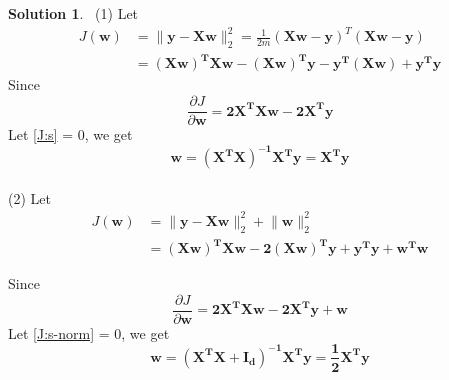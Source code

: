 \documentclass[a4paper,UTF8]{article}
\numberwithin{equation}{section}
\theoremstyle{definition}
\newtheorem*{solution}{Solution}
\begin{document}
\begin{solution} $\,$ \newline
(1)  Let 
\begin{equation}
\begin{split}
J(\mathbf{w}) &=\lVert \mathbf{y} - \mathbf {X}\mathbf{w} \rVert_2^2 = \frac{1}{2m}(\mathbf{Xw-y})^T(\mathbf{Xw-y}) \\
&= \mathbf{	(Xw)^TXw-(Xw)^Ty-y^T(Xw)+y^Ty	}
\end{split}
\end{equation}
Since
\begin{equation}
\label{J:s}
\frac{\partial J}{\partial\mathbf{w}}=\mathbf{2X^TXw-2X^{T}y}
\end{equation}
Let  \eqref{J:s} = 0, we get 
\begin{equation}
\mathbf{w}=\mathbf{(X^T X)^{-1}X^T y} = \mathbf{X^T y}
\end{equation}
~\\
(2)	Let 
\begin{equation}
\begin{split}
J(\mathbf{w}) &=\lVert \mathbf{y} - \mathbf X \mathbf{w} \rVert_2^2 + \lVert \mathbf{w}\rVert_2^2 \\
&= \mathbf{	(Xw)^TXw-2(Xw)^Ty+y^Ty	 + w^Tw}
\end{split}
\end{equation}

 Since
\begin{equation}
\label{J:s-norm}
\frac{\partial J}{\partial\mathbf{w}}=\mathbf{2X^TXw-2X^{T}y + w}
\end{equation}
Let  \eqref{J:s-norm} = 0, we get 
\begin{equation}
\mathbf{w}=\mathbf{(X^T X + I_d)^{-1}X^T y}  = \mathbf{\frac{1}{2}X^T y} 
\end{equation}
~\\
~\\
~\\
~\\
\end{solution}
\end{document}

